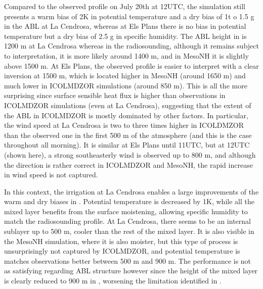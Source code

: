 \hfill

Compared to the observed profile on July 20th at 12UTC, the \noirr simulation still presents a warm bias of 2K in potential temperature and a dry bias of 1t o 1.5 g \perkg in the ABL at La Cendrosa, whereas at Els Plans there is no bias in potential temperature but a dry bias of 2.5 g \perkg in specific humidity. 
The ABL height in \noirr is 1200 m at La Cendrosa whereas in the radiosounding, although it remains subject to interpretation, it is more likely around 1400 m, and in MesoNH it is slightly above 1500 m.
At Els Plans, the observed profile is easier to interpret with a clear inversion at 1500 m, which is located higher in MesoNH (around 1650 m) and much lower in ICOLMDZOR simulations (around 850 m). 
This is all the more surprising since surface sensible heat flux is higher than observations in ICOLMDZOR simulations (even \irrboost at La Cendrosa), suggesting that the extent of the ABL in ICOLMDZOR is mostly dominated by other factors. %
In particular, the wind speed at La Cendrosa is two to three times higher in ICOLDMZOR than the observed one in the first 500 m of the atmosphere (and this is the case throughout all morning).%
It is similar at Els Plans until 11UTC, but at 12UTC (shown here), a strong southeasterly wind is observed up to 800 m, and although the direction is rather correct in ICOLMDZOR and MesoNH, the rapid increase in wind speed is not captured.

In this context, the irrigation at La Cendrosa enables a large improvements of the warm and dry biases in \irrboost. Potential temperature is decreased by 1K, while all the mixed layer benefits from the surface moistening, allowing specific humidity to match the radiosounding profile. 
At La Cendrosa, there seems to be an internal sublayer up to 500 m, cooler than the rest of the mixed layer. It is also visible in the MesoNH simulation, where it is also moister, but this type of process is unsurprisingly not captured by ICOLMDZOR, and potential temperature is matches observations better between 500 m and 900 m.
The performance is not as satisfying regarding ABL structure however since the height of the mixed layer is clearly reduced to 900 m in \irrboost, worsening the limitation identified in \noirr. 



